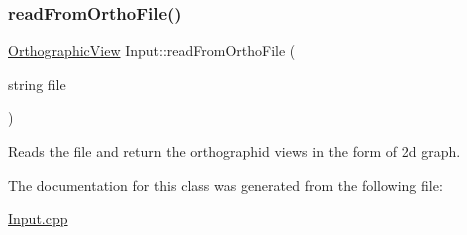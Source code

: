 \subsubsection{\texorpdfstring{read\+From\+Ortho\+File()}{readFromOrthoFile()}}
{\footnotesize\ttfamily \hyperlink{class_orthographic_view}{Orthographic\+View} Input\+::read\+From\+Ortho\+File (\begin{DoxyParamCaption}\item[{string}]{file }\end{DoxyParamCaption})}

Reads the file and return the orthographid views in the form of 2d graph. 

The documentation for this class was generated from the following file\+:\begin{DoxyCompactItemize}
\item 
\hyperlink{_input_8cpp}{Input.\+cpp}\end{DoxyCompactItemize}
